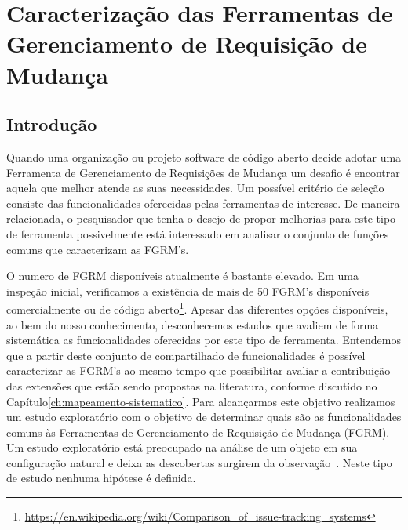 \chapter{Caracterização das Ferramentas de Gerenciamento de Requisição de
	Mudança}
\label{ch:caracterizacao}


\section{Introdução}

Quando uma organização ou projeto software de código aberto decide adotar uma
Ferramenta de Gerenciamento de Requisições de Mudança um desafio é encontrar
aquela que melhor atende as suas necessidades. Um possível critério de seleção
consiste das funcionalidades oferecidas pelas ferramentas de interesse. De
maneira relacionada, o pesquisador que tenha o desejo de propor melhorias para
este tipo de ferramenta possivelmente está interessado em analisar o conjunto de
funções comuns que caracterizam as FGRM's.

O numero de FGRM disponíveis atualmente é bastante elevado. Em uma inspeção
inicial, verificamos a existência de mais de 50 FGRM's disponíveis
comercialmente ou de código
aberto\footnote{\url{https://en.wikipedia.org/wiki/Comparison_of_issue-tracking_systems}}.
Apesar das diferentes opções disponíveis, ao bem do nosso conhecimento,
desconhecemos estudos que avaliem de forma sistemática as funcionalidades
oferecidas por este tipo de ferramenta. Entendemos que a partir deste conjunto
de compartilhado de funcionalidades é possível caracterizar as FGRM's ao mesmo
tempo que possibilitar avaliar a contribuição das extensões que estão sendo
propostas na literatura, conforme discutido no
Capítulo\ref{ch:mapeamento-sistematico}.  Para alcançarmos este objetivo
realizamos um estudo exploratório com o objetivo de determinar quais são as
funcionalidades comuns às Ferramentas de Gerenciamento de Requisição de Mudança
(FGRM). Um estudo exploratório está preocupado na análise de um objeto em sua
configuração natural e deixa as descobertas surgirem da
observação~\cite{wohlin2012experimentation}. Neste tipo de estudo nenhuma
hipótese é definida.

